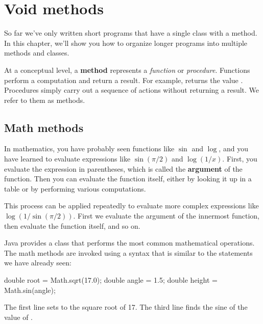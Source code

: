 \chapter{Void methods}

So far we've only written short programs that have a single class with a  method.
In this chapter, we'll show you how to organize longer programs into multiple methods and classes.


At a conceptual level, a {\bf method} represents a {\em function} or {\em procedure}.
Functions perform a computation and return a result.
For example,  returns the value .
Procedures simply carry out a sequence of actions without returning a result.
We refer to them as  methods.


\section{Math methods}


In mathematics, you have probably seen functions like $\sin$ and $\log$, and you have learned to evaluate expressions like $\sin(\pi/2)$ and $\log(1/x)$.
First, you evaluate the expression in parentheses, which is called the {\bf argument} of the function.
Then you can evaluate the function itself, either by looking it up in a table or by performing various computations.

This process can be applied repeatedly to evaluate more complex expressions like $\log(1/\sin(\pi/2))$.
First we evaluate the argument of the innermost function, then evaluate the function itself, and so on.

Java provides a  class that performs the most common mathematical operations.
The math methods are invoked using a syntax that is similar to the  statements we have already seen:

\begin{code}
    double root = Math.sqrt(17.0);
    double angle = 1.5;
    double height = Math.sin(angle);
\end{code}

The first line sets  to the square root of 17.
The third line finds the sine of the value of .

